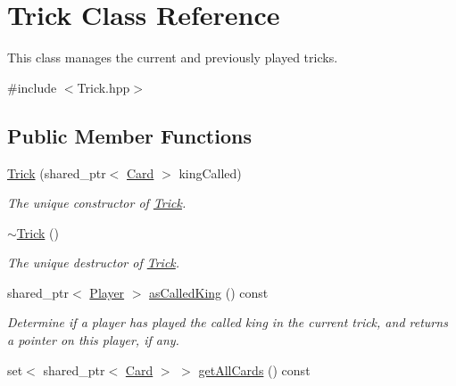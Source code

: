 \hypertarget{classTrick}{\section{\-Trick \-Class \-Reference}
\label{classTrick}
}


\-This class manages the current and previously played tricks.  




{\ttfamily \#include $<$\-Trick.\-hpp$>$}

\subsection*{\-Public \-Member \-Functions}
\begin{DoxyCompactItemize}
\item 
\hyperlink{classTrick_a2d52be4c67d65793531d2dc96122ae72}{\-Trick} (shared\-\_\-ptr$<$ \hyperlink{classCard}{\-Card} $>$ king\-Called)
\begin{DoxyCompactList}\small\item\em \-The unique constructor of \hyperlink{classTrick}{\-Trick}. \end{DoxyCompactList}\item 
\hypertarget{classTrick_a96a443338c26a142b45ba08c2f5748a1}{\hyperlink{classTrick_a96a443338c26a142b45ba08c2f5748a1}{$\sim$\-Trick} ()}\label{classTrick_a96a443338c26a142b45ba08c2f5748a1}

\begin{DoxyCompactList}\small\item\em \-The unique destructor of \hyperlink{classTrick}{\-Trick}. \end{DoxyCompactList}\item 
\hypertarget{classTrick_a4d196a8097feccd87f1aca65ea4e80c8}{shared\-\_\-ptr$<$ \hyperlink{classPlayer}{\-Player} $>$ \hyperlink{classTrick_a4d196a8097feccd87f1aca65ea4e80c8}{as\-Called\-King} () const }\label{classTrick_a4d196a8097feccd87f1aca65ea4e80c8}

\begin{DoxyCompactList}\small\item\em \-Determine if a player has played the called king in the current trick, and returns a pointer on this player, if any. \end{DoxyCompactList}\item 
\hypertarget{classTrick_a1db9b6c13def25e38b6604b56d97ddd2}{set$<$ shared\-\_\-ptr$<$ \hyperlink{classCard}{\-Card} $>$ $>$ \hyperlink{classTrick_a1db9b6c13def25e38b6604b56d97ddd2}{get\-All\-Cards} () const }\label{classTrick_a1db9b6c13def25e38b6604b56d97ddd2}


\end{DoxyCompactItemize}
